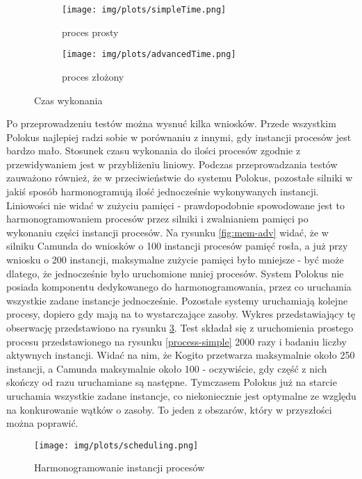 \documentclass[declaration,shortabstract,mgr]{iithesis}
\begin{document}
\begin{figure}[H]
     \centering
     \begin{subfigure}[b]{0.49\textwidth}
         \centering
         \texttt{[image: img/plots/simpleTime.png]}
         \caption{proces prosty}
     \end{subfigure}
     \hfill
     \begin{subfigure}[b]{0.49\textwidth}
         \centering
         \texttt{[image: img/plots/advancedTime.png]}
         \caption{proces złożony}
         \label{fig:time-adv}
     \end{subfigure}
        \caption{Czas wykonania}
        \label{fig:time}
\end{figure}

Po przeprowadzeniu testów można wysnuć kilka wniosków. Przede wszystkim Polokus najlepiej radzi sobie w porównaniu z innymi, gdy instancji procesów jest bardzo mało. Stosunek czasu wykonania do ilości procesów zgodnie z przewidywaniem jest w przybliżeniu liniowy. Podczas przeprowadzania testów zauważono również, że w przeciwieństwie do systemu Polokus, pozostałe silniki w jakiś sposób harmonogramują ilość jednocześnie wykonywanych instancji. Liniowości nie widać w zużyciu pamięci - prawdopodobnie spowodowane jest to harmonogramowaniem procesów przez silniki i zwalnianiem pamięci po wykonaniu części instancji procesów. Na rysunku \ref{fig:mem-adv} widać, że w silniku Camunda do wniosków o 100 instancji procesów pamięć rosła, a już przy wniosku o 200 instancji, maksymalne zużycie pamięci było mniejsze - być może dlatego, że jednocześnie było uruchomione mniej procesów. System Polokus nie posiada komponentu dedykowanego do harmonogramowania, przez co uruchamia wszystkie zadane instancje jednocześnie. Pozostałe systemy uruchamiają kolejne procesy, dopiero gdy mają na to wystarczające zasoby. Wykres przedstawiający tę obserwację przedstawiono na rysunku \ref{fig:scheduling}. Test składał się z uruchomienia prostego procesu przedstawionego na rysunku \ref{process-simple} 2000 razy i badaniu liczby aktywnych instancji. Widać na nim, że Kogito przetwarza maksymalnie około 250 instancji, a Camunda maksymalnie około 100 - oczywiście, gdy część z nich skończy od razu uruchamiane są następne. Tymczasem Polokus już na starcie uruchamia wszystkie zadane instancje, co niekoniecznie jest optymalne ze względu na konkurowanie wątków o zasoby. To jeden z obszarów, który w przyszłości można poprawić.

\begin{figure}[h]
     \centering
     \texttt{[image: img/plots/scheduling.png]}
     \caption{Harmonogramowanie instancji procesów}
     \label{fig:scheduling}
\end{figure}
\end{document}
